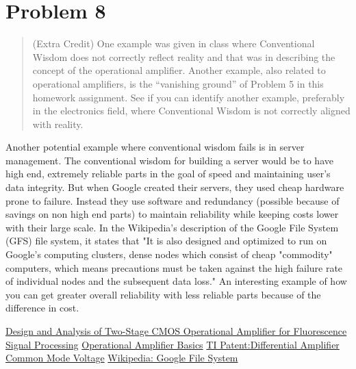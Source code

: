 \documentclass[10pt,a4paper]{article}
\begin{document}
\section{Problem 8}
\begin{quote}
(Extra Credit)
One example was given in class where Conventional Wisdom does not correctly reflect reality and that was in describing the concept of the operational amplifier. Another example, also related to operational amplifiers, is the ``vanishing ground'' of Problem 5 in this homework assignment. See if you can identify another example, preferably in the electronics field, where Conventional Wisdom is not correctly aligned with reality.
\end{quote}

Another potential example where conventional wisdom fails is in server management. The conventional wisdom for building a server would be to have high end, extremely reliable parts in the goal of speed and maintaining user's data integrity. But when Google created their servers, they used cheap hardware prone to failure. Instead they use software and redundancy (possible because of savings on non high end parts) to maintain reliability while keeping costs lower with their large scale. In the Wikipedia's description of the Google File System (GFS) file system, it states that "It is also designed and optimized to run on Google's computing clusters, dense nodes which consist of cheap "commodity" computers, which means precautions must be taken against the high failure rate of individual nodes and the subsequent data loss."\cite{GFS} An interesting example of how you can get greater overall reliability with less reliable parts because of the difference in cost.





\begin{thebibliography}{9}
\href{https://ieeexplore.ieee.org/document/9532225}{Design and Analysis of Two-Stage CMOS Operational Amplifier for Fluorescence Signal Processing}
\href{https://www.electronics-tutorials.ws/opamp/opamp_1.html
}{Operational Amplifier Basics}
\href{https://github.com/Jetsama/EE435/blob/main/HW1/Sources/US20230051462A1.pdf}{TI Patent:Differential Amplifier Common Mode Voltage}
\href{https://en.wikipedia.org/wiki/Google_File_System}{Wikipedia: Google File System}

\end{thebibliography}
\end{document}
